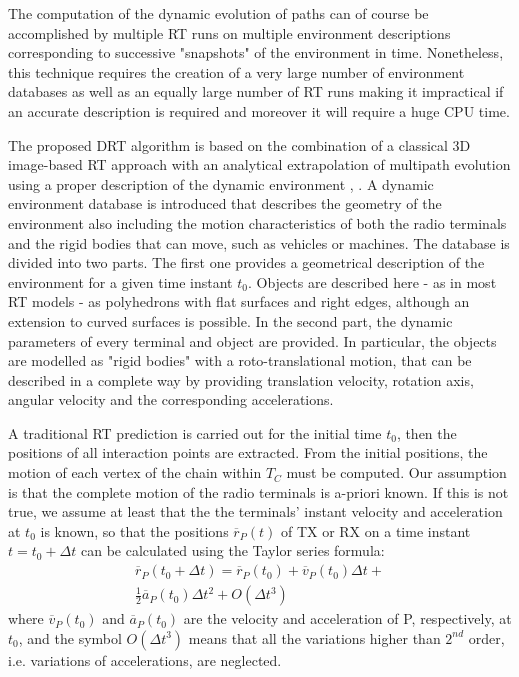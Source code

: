 The computation of the dynamic evolution of paths can of course be accomplished by multiple RT runs on multiple environment descriptions corresponding to successive "snapshots" of the environment in time. Nonetheless, this technique requires the creation of a very large number of environment databases as well as an equally large number of RT runs making it impractical if an accurate description is required and moreover it will require a huge CPU time. \par
The proposed DRT algorithm is based on the combination of a classical 3D image-based RT approach with an analytical extrapolation of multipath evolution using a proper description of the dynamic environment \cite{bilibashi}, \cite{bilibashi2}. A dynamic environment database is introduced that describes the geometry of the environment also including the motion characteristics of both the radio terminals and the rigid bodies that can move, such as vehicles or machines. The database is divided into two parts. The first one provides a geometrical description of the environment for a given time instant $t_0$. Objects are described here - as in most RT models - as polyhedrons with flat surfaces and right edges, although an extension to curved surfaces is possible. In the second part, the dynamic parameters of every terminal and object are provided. In particular, the objects are modelled as "rigid bodies" with a roto-translational motion, that can be described in a complete way by providing translation velocity, rotation axis, angular velocity and the corresponding accelerations. \par
%
%
A traditional RT prediction is carried out for the initial time $t_0$, then the positions of all interaction points are extracted. From the initial positions, the motion of each vertex of the chain within $T_C$ must be computed. Our assumption is that the complete motion of the radio terminals is a-priori known. If this is not true, we assume at least that the the terminals' instant velocity and acceleration at $t_0$ is known, so that the positions $\overline{r}_P(t)$ of TX or RX on a time instant $t=t_{0}+\Delta t$ can be calculated using the Taylor series formula:
\begin{equation}
\begin{gathered}
 \overline{r}_P(t_{0}+\Delta t) = \overline{r}_P(t_{0}) + \overline{v}_{P}(t_0) \Delta t +  \\
 \frac{1}{2} \overline{a}_{P}(t_0) \Delta t^2 + O(\Delta t^3)
\end{gathered}
\label{Taylor}
\end{equation}
where $\overline{v}_{P}(t_0)$ and $\overline{a}_{P}(t_0)$ are the velocity and acceleration of P, respectively, at $t_0$, and the symbol $O(\Delta t^3)$ means that all the variations higher than $2^{nd}$ order, i.e. variations of accelerations, are neglected.

